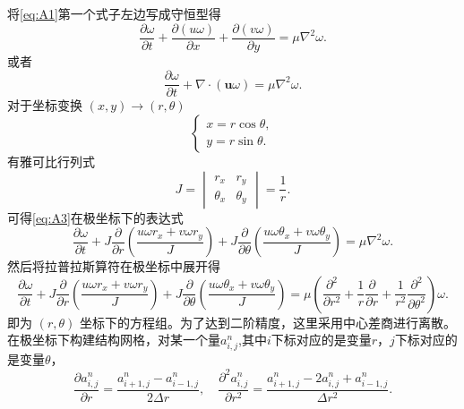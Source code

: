 \documentclass[12pt]{article}
\begin{document}
将\cref{eq:A1}第一个式子左边写成守恒型得
\begin{equation}
	\frac{\partial \omega}{\partial t} + \frac{\partial (u\omega)}{\partial x} + \frac{\partial (v\omega)}{\partial y} = \mu \nabla^2 \omega.
	\label{eq:A2}
\end{equation}
或者
\begin{equation}
	\frac{\partial \omega}{\partial t} + \nabla \cdot (\bm{u}\omega) = \mu \nabla^2 \omega.
	\label{eq:A3}
\end{equation}
对于坐标变换 $(x,y)\to(r, \theta)$
\begin{equation}
	\begin{cases}
		x = r \cos \theta, \\
		y = r \sin \theta.
	\end{cases}
\end{equation}
有雅可比行列式
\begin{equation}
	J=
	\begin{vmatrix}
		r_{x}      & r_{y}      \\
		\theta_{x} & \theta_{y}
	\end{vmatrix}=\frac{1}{r}.
\end{equation}
可得\cref{eq:A3}在极坐标下的表达式\cite{cfd}
\begin{equation}
	\frac{\partial \omega}{\partial t}+J\frac{\partial}{\partial r}\left(\frac{u\omega r_{x}+v\omega r_{y}}{J}\right)+J\frac{\partial}{\partial \theta}\left(\frac{u\omega \theta_{x}+v\omega \theta_{y}}{J}\right)=\mu \nabla^2 \omega.
	\label{eq:A4}
\end{equation}
然后将拉普拉斯算符在极坐标中展开得
\begin{equation}
	\frac{\partial \omega}{\partial t}+J\frac{\partial}{\partial r}\left(\frac{u\omega r_{x}+v\omega r_{y}}{J}\right)+J\frac{\partial}{\partial \theta}\left(\frac{u\omega \theta_{x}+v\omega \theta_{y}}{J}\right)=\mu \left(\frac{\partial^2}{\partial r^2} + \frac{1}{r}\frac{\partial}{\partial r} + \frac{1}{r^2}\frac{\partial^2}{\partial \theta^2} \right) \omega.
	\label{eq:A5}
\end{equation}
即为 $(r, \theta)$ 坐标下的方程组。为了达到二阶精度，这里采用中心差商进行离散。在极坐标下构建结构网格，对某一个量$a^n_{i,j}$,其中$i$下标对应的是变量$r$，$j$下标对应的是变量$\theta$，
\begin{equation}
	\frac{\partial a^n_{i,j}}{\partial r} = \frac{a^n_{i+1,j}-a^n_{i-1,j}}{2\Delta r},\quad \frac{\partial^2 a^n_{i,j}}{\partial r^2} = \frac{a^n_{i+1,j}-2a^n_{i,j}+a^n_{i-1,j}}{\Delta r^2}.
	\label{eq:A6}
\end{equation}
\end{document}
